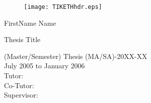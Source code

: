   \begin{titlepage}

  \begin{center}
  \begin{figure}[!t]
     \texttt{[image: TIKETHhdr.eps]}
  \end{figure}
  \end{center}

  \vspace{2 cm}

  {\large FirstName Name}
  \vspace{2 cm}

  {\Huge Thesis Title}\\

  \vspace{\fill}


  (Master/Semester) Thesis (MA/SA)-20XX-XX\\
  July 2005 to January 2006\\

  \vspace{1cm}
  Tutor: \\
  Co-Tutor: \\
  Supervisor: \\
    
  \end{titlepage}
